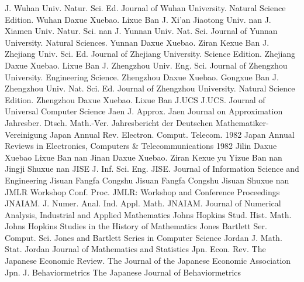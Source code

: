 {J. Wuhan Univ. Natur. Sci. Ed.}
{Journal of Wuhan University. Natural Science Edition. Wuhan Daxue Xuebao. Lixue Ban}
{J. Xi'an Jiaotong Univ.}
{nan}
{J. Xiamen Univ. Natur. Sci.}
{nan}
{J. Yunnan Univ. Nat. Sci.}
{Journal of Yunnan University. Natural Sciences. Yunnan Daxue Xuebao. Ziran Kexue Ban}
{J. Zhejiang Univ. Sci. Ed.}
{Journal of Zhejiang University. Science Edition. Zhejiang Daxue Xuebao. Lixue Ban}
{J. Zhengzhou Univ. Eng. Sci.}
{Journal of Zhengzhou University. Engineering Science. Zhengzhou Daxue Xuebao. Gongxue Ban}
{J. Zhengzhou Univ. Nat. Sci. Ed.}
{Journal of Zhengzhou University. Natural Science Edition. Zhengzhou Daxue Xuebao. Lixue Ban}
{J.UCS}
{J.UCS. Journal of Universal Computer Science}
{Jaen J. Approx.}
{Jaen Journal on Approximation}
{Jahresber. Dtsch. Math.-Ver.}
{Jahresbericht der Deutschen Mathematiker-Vereinigung}
{Japan Annual Rev. Electron. Comput. Telecom. 1982}
{Japan Annual Reviews in Electronics, Computers & Telecommunications 1982}
{Jilin Daxue Xuebao Lixue Ban}
{nan}
{Jinan Daxue Xuebao. Ziran Kexue yu Yizue Ban}
{nan}
{Jingji Shuxue}
{nan}
{JISE J. Inf. Sci. Eng.}
{JISE. Journal of Information Science and Engineering}
{Jisuan Fangfa Congshu}
{Jisuan Fangfa Congshu}
{Jisuan Shuxue}
{nan}
{JMLR Workshop Conf. Proc.}
{JMLR: Workshop and Conference Proceedings}
{JNAIAM. J. Numer. Anal. Ind. Appl. Math.}
{JNAIAM. Journal of Numerical Analysis, Industrial and Applied Mathematics}
{Johns Hopkins Stud. Hist. Math.}
{Johns Hopkins Studies in the History of Mathematics}
{Jones Bartlett Ser. Comput. Sci.}
{Jones and Bartlett Series in Computer Science}
{Jordan J. Math. Stat.}
{Jordan Journal of Mathematics and Statistics}
{Jpn. Econ. Rev.}
{The Japanese Economic Review. The Journal of the Japanese Economic Association}
{Jpn. J. Behaviormetrics}
{The Japanese Journal of Behaviormetrics}
